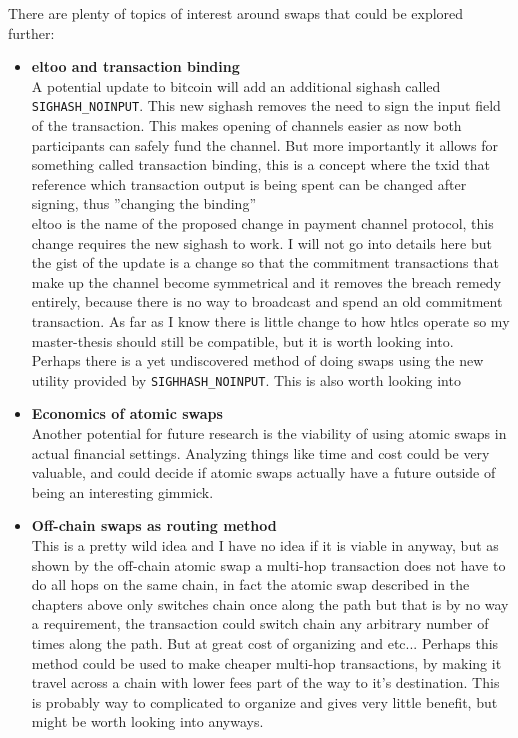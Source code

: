 There are plenty of topics of interest around swaps that could be explored further:
\begin{itemize}
	\item \textbf{eltoo and transaction binding}\\A potential update to bitcoin will add an additional sighash called \texttt{SIGHASH\_NOINPUT}. This new sighash removes the need to sign the input field of the transaction. This makes opening of channels easier as now both participants can safely fund the channel. But more importantly it allows for something called transaction binding, this is a concept where the txid that reference which transaction output is being spent can be changed after signing, thus ''changing the binding''\\
	
	eltoo is the name of the proposed change in payment channel protocol, this change requires the new sighash to work. I will not go into details here but the gist of the update is a change so that the commitment transactions that make up the channel become symmetrical and it removes the breach remedy entirely, because there is no way to broadcast and spend an old commitment transaction. As far as I know there is little change to how htlcs operate so my master-thesis should still be compatible, but it is worth looking into.\\
	
	Perhaps there is a yet undiscovered method of doing swaps using the new utility provided by \texttt{SIGHHASH\_NOINPUT}. This is also worth looking into\\
	
	\item \textbf{Economics of atomic swaps}\\Another potential for future research is the viability of using atomic swaps in actual financial settings. Analyzing things like time and cost could be very valuable, and could decide if atomic swaps actually have a future outside of being an interesting gimmick.\\
	
	\item \textbf{Off-chain swaps as routing method}\\This is a pretty wild idea and I have no idea if it is viable in anyway, but as shown by the off-chain atomic swap a multi-hop transaction does not have to do all hops on the same chain, in fact the atomic swap described in the chapters above only switches chain once along the path but that is by no way a requirement, the transaction could switch chain any arbitrary number of times along the path. But at great cost of organizing and etc... Perhaps this method could be used to make cheaper multi-hop transactions, by making it travel across a chain with lower fees part of the way to it's destination. This is probably way to complicated to organize and gives very little benefit, but might be worth looking into anyways.\\
	

\end{itemize}
